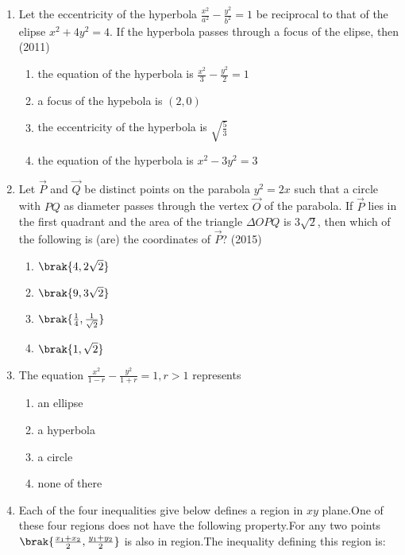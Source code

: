 \begin{enumerate}[label=\thesubsection.\arabic*.,ref=\thesubsection.\theenumi]
	\item Let the eccentricity of the hyperbola $\frac{x^2}{a^2}-\frac{y^2}{b^2}=1$ be reciprocal to that of the elipse $x^2+4y^2=4$. If the hyperbola
	passes through a focus of the elipse, then 
		\hfill(2011)
		 \begin{enumerate}
			\item the equation of the hyperbola is $\frac{x^2}{3}-\frac{y^2}{2}=1$
			\item a focus of the hypebola is $(2,0)$
			\item the eccentricity of the hyperbola is $\sqrt{\frac{5}{3}}$
			\item the equation of the hyperbola is $x^2-3y^2=3$
		 \end{enumerate}
	\item Let $\vec{P}$ and $\vec{Q}$ be distinct points on the parabola $y^2=2x$ such 
		that a circle with $PQ$ as diameter passes through the vertex
		$\vec{O}$ of the parabola. If $\vec{P}$ lies in the first quadrant and the area
		of the triangle  \(\Delta \)$OPQ$ is 3$\sqrt{2}$, then which of the following is
		(are) the coordinates of $\vec{P}$?  
		\hfill(2015)
				\begin{multicols}{4}
		 \begin{enumerate}
			\item $ \brak{4,2\sqrt{2}}$
			\item $\brak{9,3\sqrt{2}}$
			\item $ \brak{\frac{1}{4},\frac{1}{\sqrt{2}}}$
			\item  $ \brak{1,\sqrt{2}}$
		 \end{enumerate}\end{multicols}
    \item The equation $\frac{x^2}{1-r}-\frac{y^2}{1+r}=1,r > 1$
represents
          \hfill  {}
					\begin{multicols}{2}
\begin{enumerate}
    \item an ellipse    \item       a hyperbola
   \item a circle     \item    none of there 
\end{enumerate}\end{multicols}
\item Each of the four inequalities give below defines a region in $xy$ plane.One of these four regions does not have the following property.For any two points   $\brak{\frac{x_1+x_2}{2},\frac{y_1+y_2}{2}}$   is also in region.The inequality defining this region is:

\end{enumerate}
